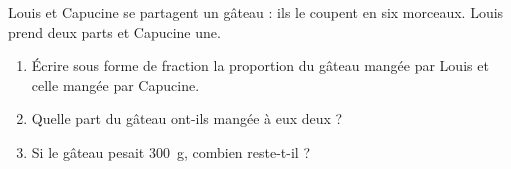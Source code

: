 
\begin{exercice}\label{exosmath-0973}

Louis et Capucine se partagent un gâteau : ils le coupent en six morceaux. Louis prend deux parts et Capucine une.
\begin{enumerate}
    \item
        Écrire sous forme de fraction la proportion du gâteau mangée par Louis et celle mangée par Capucine.
    \item
 Quelle part du gâteau ont-ils mangée à eux deux ?
 \item
     Si le gâteau pesait \SI{300}{\gram}, combien reste-t-il ?
\end{enumerate}

\end{exercice}
